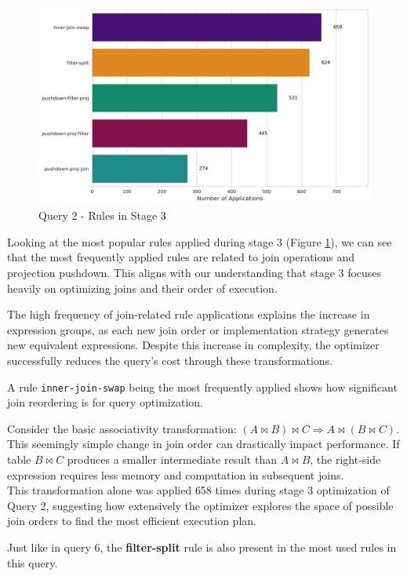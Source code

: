 \documentclass[a4paper,12pt]{scrreprt}
\begin{document}
\begin{figure}[H]
    \centering
    \includegraphics[width=\linewidth]{img/img_rule_mostpop/top_5_rules_stage3_q2.png}
    \caption{Query 2 - Rules in Stage 3}
    \label{fig:rules2}
\end{figure}

Looking at the most popular rules applied during stage 3 (Figure \ref{fig:rules2}), we can see that the most frequently applied rules are related to join operations and projection pushdown. This aligns with our understanding that stage 3 focuses heavily on optimizing joins and their order of execution.

The high frequency of join-related rule applications explains the increase in expression groups, as each new join order or implementation strategy generates new equivalent expressions. Despite this increase in complexity, the optimizer successfully reduces the query's cost through these transformations.

A rule \texttt{inner-join-swap} being the most frequently applied shows how significant join reordering is for query optimization. 

Consider the basic associativity transformation: $(A \bowtie B) \bowtie C \Rightarrow A \bowtie (B \bowtie C)$. This seemingly simple change in join order can drastically impact performance. If table $B \bowtie C$ produces a smaller intermediate result than $A \bowtie B$, the right-side expression requires less memory and computation in subsequent joins. \\
This transformation alone was applied 658 times during stage 3 optimization of Query 2, suggesting how extensively the optimizer explores the space of possible join orders to find the most efficient execution plan.

Just like in query 6, the \textbf{filter-split} rule is also present in the most used rules in this query.
\end{document}
